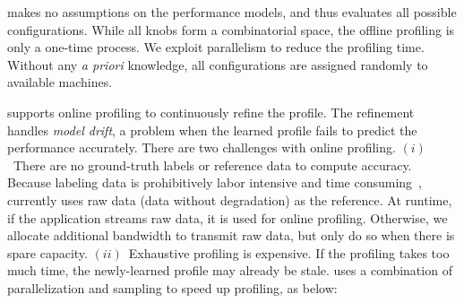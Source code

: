 \sysname{} makes no assumptions on the performance models, and thus evaluates
all possible configurations.  While all knobs form a combinatorial space, the
offline profiling is only a one-time process.  We exploit parallelism to reduce
the profiling time.  Without any \textit{a priori} knowledge, all configurations
are assigned randomly to available machines.


 \sysname{} supports online profiling to continuously
refine the profile. The refinement handles \textit{model drift}, a problem when
the learned profile fails to predict the performance accurately. There are two
challenges with online profiling.  $(i)$~There are no ground-truth labels or
reference data to compute accuracy. Because labeling data is prohibitively labor
intensive and time consuming~\cite{russell2008labelme}, \sysname{} currently
uses raw data (data without degradation) as the reference. At runtime, if the
application streams raw data, it is used for online profiling. Otherwise, we
allocate additional bandwidth to transmit raw data, but only do so when there is
spare capacity. $(ii)$~Exhaustive profiling is expensive. If the profiling takes
too much time, the newly-learned profile may already be stale. \sysname{} uses a
combination of parallelization and sampling to speed up profiling, as below:

